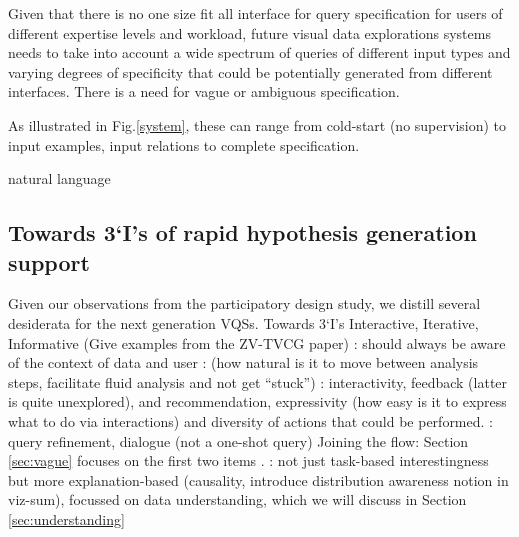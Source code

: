 \par Given that there is no one size fit all interface for query specification for users of different expertise levels and workload, future visual data explorations systems needs to take into account a wide spectrum of queries of different input types and varying degrees of specificity that could be potentially generated from different interfaces. There is a need for 
vague or ambiguous specification. 

As illustrated in Fig.\ref{system}, these can range from cold-start (no supervision) to input examples, input relations to complete specification.
\par natural language


 \subsection{Towards 3‘I’s of rapid hypothesis generation support}
Given our observations from the participatory design study, we distill several desiderata for the next generation VQSs. 
Towards 3‘I’s Interactive, Iterative, Informative (Give examples from the ZV-TVCG paper)
: should always be aware of the context of data and user 
:
 (how natural is it to move between analysis steps, facilitate fluid analysis and not get ``stuck'') : interactivity, feedback (latter is quite unexplored), and recommendation, expressivity (how easy is it to express what to do via interactions) and diversity of actions that could be performed.
: query refinement, dialogue (not a one-shot query)
Joining the flow: Section \ref{sec:vague} focuses on the first two items .
: not just task-based interestingness but more explanation-based (causality, introduce distribution awareness notion in viz-sum), focussed on data understanding, which we will discuss in Section \ref{sec:understanding}
